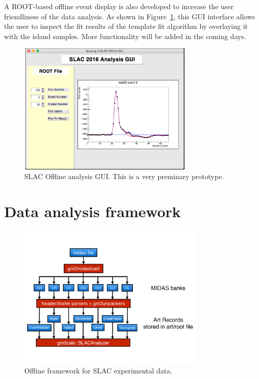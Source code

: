 \documentclass[12pt,letterpaper]{article}
\begin{document}
A ROOT-based offline event display is also developed to increase the user friendliness of the data analysis. As shown in Figure~\ref{fig:GUI}, this GUI interface allows the user to inspect the fit results of the template fit algorithm by overlaying it with the island samples.
More functionality will be added in the coming days.

\begin{figure}[htbp]
\centering
\includegraphics[width=0.75\textwidth]{pics/SLAC2016_Analysis_GUI}
\caption{SLAC Offline analysis GUI. This is a very preminary prototype.}\label{fig:GUI}
\end{figure}


\newpage
\appendix

\section{Data analysis framework}

\begin{figure}[htbp]
\centering
\includegraphics[width=0.8\textwidth]{pics/offline_slac_framework}
\caption{Offline framework for SLAC experimental data.}
\end{figure}
\end{document}
